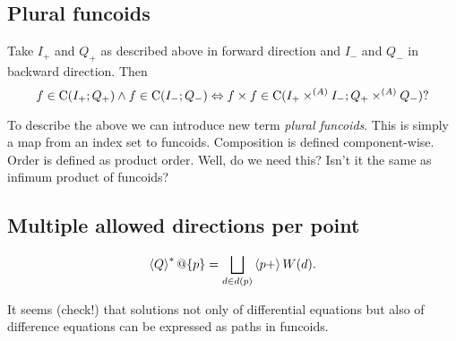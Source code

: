 \subsection{Plural funcoids}

Take $I_+$ and $Q_+$ as described above in forward direction and $I_-$ and $Q_-$ in backward direction. Then
\[ f\in\mathrm{C}(I_+;Q_+)\land f\in\mathrm{C}(I_-;Q_-) \Leftrightarrow f\times f\in\mathrm{C}(I_+\times^{(A)}I_-;Q_+\times^{(A)}Q_-)? \]

To describe the above we can introduce new term \emph{plural funcoids}. This is simply a map
from an index set to funcoids. Composition is defined component-wise. Order is defined as product order.
Well, do we need this? Isn't it the same as infimum product of funcoids?

\subsection{Multiple allowed directions per point}

\[ \rsupfun{Q}@\{p\} = \bigsqcup_{d\in d(p)} \supfun{p+} W(d). \]

It seems (check!) that solutions not only of differential equations but also of difference equations can be
expressed as paths in funcoids.